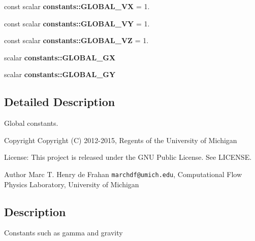 \begin{DoxyCompactItemize}
\item 
const scalar {\bfseries constants\-::\-G\-L\-O\-B\-A\-L\-\_\-\-V\-X} = 1.\label{namespaceconstants_af751ab3e1c5d294c04f50434900a0634}

\item 
const scalar {\bfseries constants\-::\-G\-L\-O\-B\-A\-L\-\_\-\-V\-Y} = 1.\label{namespaceconstants_a874ebd065ce820a915b65e51d0f6c993}

\item 
const scalar {\bfseries constants\-::\-G\-L\-O\-B\-A\-L\-\_\-\-V\-Z} = 1.\label{namespaceconstants_a82b2abd56cf45533a383080e1f1e4686}

\item 
scalar {\bfseries constants\-::\-G\-L\-O\-B\-A\-L\-\_\-\-G\-X}\label{namespaceconstants_a178e454a02858256f16f7bb35469dd86}

\item 
scalar {\bfseries constants\-::\-G\-L\-O\-B\-A\-L\-\_\-\-G\-Y}\label{namespaceconstants_a4998fe77bf85da8edda0f9f0f67b348a}

\end{DoxyCompactItemize}


\subsection{Detailed Description}
Global constants. \begin{DoxyCopyright}{Copyright}
Copyright (C) 2012-\/2015, Regents of the University of Michigan 
\end{DoxyCopyright}
\begin{DoxyParagraph}{License\-:}
This project is released under the G\-N\-U Public License. See L\-I\-C\-E\-N\-S\-E. 
\end{DoxyParagraph}
\begin{DoxyAuthor}{Author}
Marc T. Henry de Frahan {\tt marchdf@umich.\-edu}, Computational Flow Physics Laboratory, University of Michigan 
\end{DoxyAuthor}
\subsection{Description}\label{scalar__def_8h_Description}
Constants such as gamma and gravity 